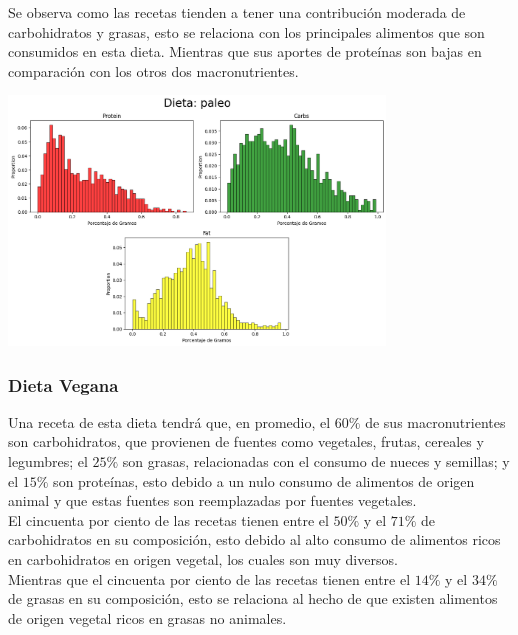 \documentclass[12pt,a4paper]{article}
\begin{document}
        Se observa como las recetas tienden a tener una contribución moderada de 
        carbohidratos y grasas, esto se relaciona con los principales alimentos 
        que son consumidos en esta dieta. Mientras que sus aportes de proteínas 
        son bajas en comparación con los otros dos macronutrientes.
        \begin{center}
            \includegraphics[width=0.75\textwidth]{Resources/2_03_plot_04.png}
        \end{center}

    \subsubsection{Dieta Vegana}
        Una receta de esta dieta tendrá que, en promedio, el $60\%$ de 
        sus macronutrientes son carbohidratos, que provienen de fuentes 
        como vegetales, frutas, cereales y legumbres; el $25\%$ son grasas, 
        relacionadas con el consumo de nueces y semillas; y el $15\%$ son 
        proteínas, esto debido a un nulo consumo de alimentos de origen 
        animal y que estas fuentes son reemplazadas por fuentes vegetales.\\

        El cincuenta por ciento de las recetas tienen entre el $50\%$ y el $71\%$ 
        de carbohidratos en su composición, esto debido al alto consumo de 
        alimentos ricos en carbohidratos en origen vegetal, los cuales son 
        muy diversos.\\

        Mientras que el cincuenta por ciento de las recetas tienen entre el $14\%$ y 
        el $34\%$ de grasas en su composición, esto se relaciona al hecho de que 
        existen alimentos de origen vegetal ricos en grasas no animales.\\
        
\end{document}
